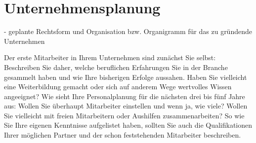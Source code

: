 
\section{Unternehmensplanung}
- geplante Rechtsform und Organisation bzw. Organigramm für das zu gründende Unternehmen

Der erste Mitarbeiter in Ihrem Unternehmen sind zunächst Sie selbst: Beschreiben Sie daher, welche beruflichen Erfahrungen Sie in der Branche gesammelt haben und wie Ihre bisherigen Erfolge aussahen. Haben Sie vielleicht eine Weiterbildung gemacht oder sich auf anderem Wege wertvolles Wissen angeeignet? Wie sieht Ihre Personalplanung für die nächsten drei bis fünf Jahre aus: Wollen Sie überhaupt Mitarbeiter einstellen und wenn ja, wie viele? Wollen Sie vielleicht mit freien Mitarbeitern oder Aushilfen zusammenarbeiten? So wie Sie Ihre eigenen Kenntnisse aufgelistet haben, sollten Sie auch die Qualifikationen Ihrer möglichen Partner und der schon feststehenden Mitarbeiter beschreiben.

